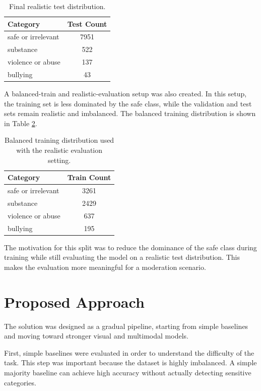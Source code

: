 \documentclass[12pt]{article}
\begin{document}
\begin{table}[H]
\centering
\begin{tabular}{lc}
\toprule
\textbf{Category} & \textbf{Test Count} \\
\midrule
safe or irrelevant & 7951 \\
substance & 522 \\
violence or abuse & 137 \\
bullying & 43 \\
\bottomrule
\end{tabular}
\caption{Final realistic test distribution.}
\label{tab:realistic_test_dist}
\end{table}

A balanced-train and realistic-evaluation setup was also created. In this setup, the training set is less dominated by the safe class, while the validation and test sets remain realistic and imbalanced. The balanced training distribution is shown in Table \ref{tab:train_dist}.

\begin{table}[H]
\centering
\begin{tabular}{lc}
\toprule
\textbf{Category} & \textbf{Train Count} \\
\midrule
safe or irrelevant & 3261 \\
substance & 2429 \\
violence or abuse & 637 \\
bullying & 195 \\
\bottomrule
\end{tabular}
\caption{Balanced training distribution used with the realistic evaluation setting.}
\label{tab:train_dist}
\end{table}

The motivation for this split was to reduce the dominance of the safe class during training while still evaluating the model on a realistic test distribution. This makes the evaluation more meaningful for a moderation scenario.

\section{Proposed Approach}

The solution was designed as a gradual pipeline, starting from simple baselines and moving toward stronger visual and multimodal models.

First, simple baselines were evaluated in order to understand the difficulty of the task. This step was important because the dataset is highly imbalanced. A simple majority baseline can achieve high accuracy without actually detecting sensitive categories.
\end{document}
